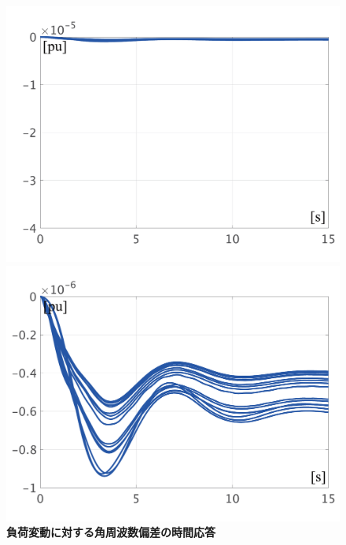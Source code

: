 \documentclass[tombow,dvipdfmx]{corona-a5-1.1}
\begin{document}
\begin{figure}[t]
{\begin{minipage}{0.49\linewidth}
    \includegraphics[width = 1.0\linewidth]{figs/WavrWagc}
    \medskip
  \end{minipage}
  \begin{minipage}{0.49\linewidth}
    \centering
    \includegraphics[width = 1.0\linewidth]{figs/WavrWagcL}
    \medskip
  \end{minipage}
  }
  \medskip
  \caption{\textbf{負荷変動に対する角周波数偏差の時間応答} }
  \label{fig:omegasAGC}
\medskip
\end{figure}
\end{document}
